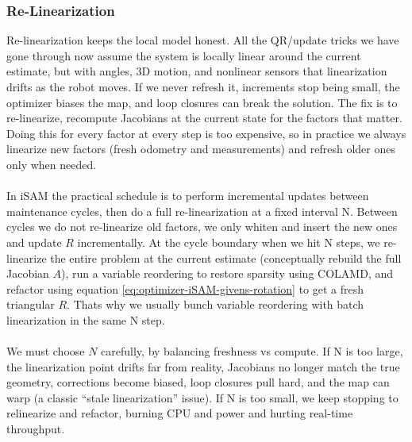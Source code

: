 \subsubsection{Re-Linearization}
Re-linearization keeps the local model honest. All the QR/update tricks we have gone through now assume the system is locally linear around the current estimate, but with angles, 3D motion, and nonlinear sensors that linearization drifts as the robot moves. If we never refresh it, increments stop being small, the optimizer biases the map, and loop closures can break the solution. The fix is to re-linearize, recompute Jacobians at the current state for the factors that matter. Doing this for every factor at every step is too expensive, so in practice we always linearize new factors (fresh odometry and measurements) and refresh older ones only when needed.
\\ \\
In \gls{iSAM} the practical schedule is to perform incremental updates between maintenance cycles, then do a full re-linearization at a fixed interval N. Between cycles we do not re-linearize old factors, we only whiten and insert the new ones and update $R$ incrementally. At the cycle boundary when we hit N steps, we re-linearize the entire problem at the current estimate (conceptually rebuild the full Jacobian $A$), run a variable reordering to restore sparsity using \gls{COLAMD}, and refactor using equation \eqref{eq:optimizer-iSAM-givens-rotation} to get a fresh triangular $R$. Thats why we usually bunch variable reordering with batch linearization in the same N step. 
\\ \\
We must choose $N$ carefully, by balancing freshness vs compute. If N is too large, the linearization point drifts far from reality, Jacobians no longer match the true geometry, corrections become biased, loop closures pull hard, and the map can warp (a classic ``stale linearization'' issue). If N is too small, we keep stopping to relinearize and refactor, burning CPU and power and hurting real-time throughput.



